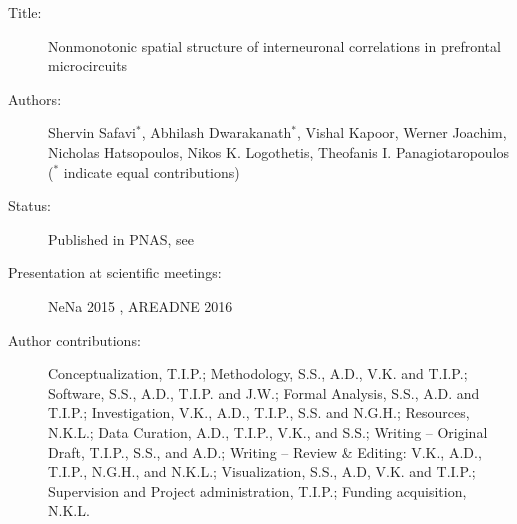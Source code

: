 \begin{description}
\item[Title:]
  Nonmonotonic spatial structure of interneuronal correlations in prefrontal microcircuits
\item[Authors:]
  Shervin Safavi$^*$,
  Abhilash Dwarakanath$^*$,
  Vishal Kapoor,
  Werner Joachim,
  Nicholas Hatsopoulos,
  Nikos K. Logothetis,
  Theofanis I. Panagiotaropoulos 
  ($^*$ indicate equal contributions) 
\item[Status:]
  Published in PNAS, see \citet{safaviNonmonotonicSpatialStructure2018}
\item[Presentation at scientific meetings:]
  NeNa 2015 \cite{dwarakanathTemporalRegimesStateDependent2015},
  AREADNE 2016 \cite{safaviNonMonotonicCorrelationStructure2016}
\item[Author contributions:]
  Conceptualization, T.I.P.; 
  Methodology, S.S., A.D., V.K. and T.I.P.;
  Software, S.S., A.D., T.I.P. and J.W.;
  Formal Analysis, S.S., A.D. and T.I.P.;
  Investigation, V.K., A.D., T.I.P., S.S. and N.G.H.;
  Resources, N.K.L.;
  Data Curation, A.D., T.I.P., V.K., and S.S.;
  Writing -- Original Draft, T.I.P., S.S., and A.D.;
  Writing -- Review \& Editing: V.K., A.D., T.I.P., N.G.H., and N.K.L.;
  Visualization, S.S., A.D, V.K. and T.I.P.;
  Supervision and Project administration, T.I.P.;
  Funding acquisition, N.K.L.
\end{description}

